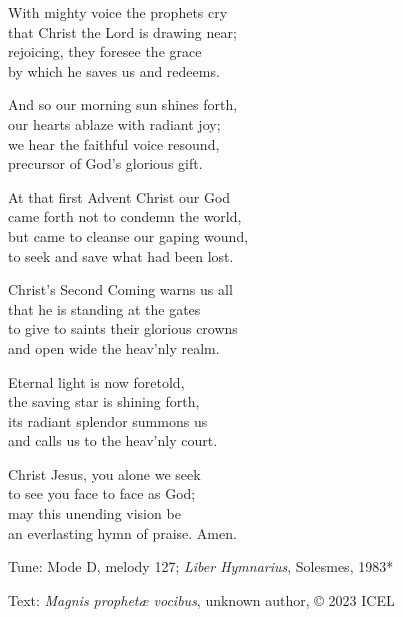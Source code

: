 \hymn

\settowidth{\versewidth}{to give to saints their glorious crowns}

\begin{hymnverse}[\versewidth]
With mighty voice the prophets cry\\
that Christ the Lord is drawing near;\\
rejoicing, they foresee the grace\\
by which he saves us and redeems.

And so our morning sun shines forth,\\
our hearts ablaze with radiant joy;\\
we hear the faithful voice resound,\\
precursor of God’s glorious gift.

At that first Advent Christ our God\\
came forth not to condemn the world,\\
but came to cleanse our gaping wound,\\
to seek and save what had been lost.

Christ’s Second Coming warns us all\\
that he is standing at the gates\\
to give to saints their glorious crowns\\
and open wide the heav’nly realm.

Eternal light is now foretold,\\
the saving star is shining forth,\\
its radiant splendor summons us\\
and calls us to the heav’nly court.

Christ Jesus, you alone we seek\\
to see you face to face as God;\\
may this unending vision be\\
an everlasting hymn of praise. Amen.
\end{hymnverse}

\begin{hymnsource}
Tune: Mode D, melody 127; \emph{Liber Hymnarius}, Solesmes, 1983*

Text: \emph{Magnis prophetæ vocibus}, unknown author, © 2023 ICEL
\end{hymnsource}